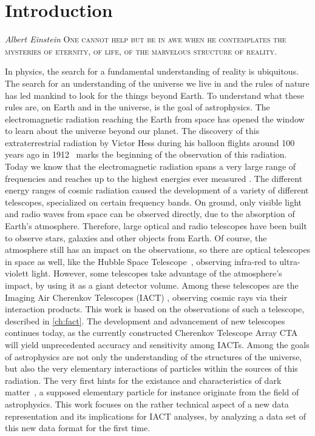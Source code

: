 \chapter{Introduction}
\nocite{biblatex, siunitx, Hunter:2007}%
%
\begin{aquote}{\textit{Albert Einstein}}
\textsc{One cannot help but be in awe when he contemplates the mysteries of eternity, of life, of the marvelous structure of reality.}
\end{aquote}
In physics, the search for a fundamental understanding of reality is ubiquitous. The search for an understanding of the universe we live in and the rules of nature has
led mankind to look for the things beyond Earth. To understand what these rules
are, on Earth and in the universe, is the goal of astrophysics. The electromagnetic radiation reaching the Earth from space has opened the window to learn
about the universe beyond our planet. The discovery of this extraterrestrial
radiation by Victor Hess during his balloon flights around \num{100} years ago in \num{1912}~\cite{Hess} marks the beginning of the observation of this radiation.
Today we know that the electromagnetic radiation spans a very large range of
frequencies and reaches up to the highest energies ever measured \cite{aharonian}.
The different energy ranges of cosmic radiation caused the development of a
variety of different telescopes, specialized on certain frequency bands. On
ground, only visible light and radio waves from space can be observed directly,
due to the absorption of Earth's atmosphere. Therefore, large optical and radio
telescopes have been built to observe stars, galaxies and other objects from
Earth. Of course, the atmosphere still has an impact on the observations, so
there are optical telescopes in space as well, like the Hubble Space
Telescope~\cite{hubble}, observing infra-red to ultra-violett light. However,
some telescopes take advantage of the atmosphere's impact, by using it as a
giant detector volume. Among these telescopes are the Imaging Air Cherenkov
Telescopes (IACT) \cite{whipple}, observing cosmic rays via their interaction products. This
work is based on the observations of such a telescope, described in
\autoref{ch:fact}. The development and advancement of new telescopes continues
today, as the currently constructed Cherenkov Telescope Array CTA~\cite{cta}
will yield unprecedented accuracy and sensitivity among IACTs.
Among the goals of astrophysics are not only the understanding of the
structures of the universe, but also the very elementary interactions of
particles within the sources of this radiation. The very first hints for the
existance and characteristics of dark matter~\cite{zwicky}, a supposed
elementary particle for instance originate from the field of astrophysics.
This work focuses on the rather technical aspect of a new data representation
and its implications for IACT analyses, by analyzing a data set of this new data
format for the first time.
